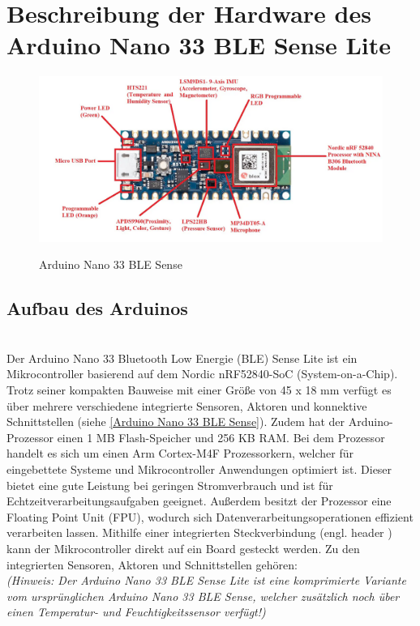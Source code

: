
\chapter{Beschreibung der Hardware des Arduino Nano 33 BLE Sense Lite}
\begin{figure}[htb]
	\begin{center}
		
		\includegraphics[width=\textwidth]{General/ArduinoBoard.png}
		\caption{Arduino Nano 33 BLE Sense}\cite{eTech.2021} \label{Arduino Nano 33 BLE Sense}
	\end{center}
\end{figure}
\section{Aufbau des Arduinos}
\cite{Ard}
\\
Der Arduino Nano 33 Bluetooth Low Energie (BLE) Sense Lite ist ein Mikrocontroller basierend auf dem Nordic nRF52840-SoC (System-on-a-Chip). Trotz seiner kompakten Bauweise mit einer Größe von 45 x 18 mm verfügt es über mehrere verschiedene integrierte Sensoren, Aktoren und konnektive Schnittstellen (siehe \autoref{Arduino Nano 33 BLE Sense}). Zudem hat der Arduino-Prozessor einen 1 MB Flash-Speicher und 256 KB RAM. Bei dem Prozessor handelt es sich um einen Arm \textregistered Cortex-M4F Prozessorkern, welcher für eingebettete Systeme und Mikrocontroller Anwendungen optimiert ist. Dieser bietet eine gute Leistung bei geringen Stromverbrauch und ist für Echtzeitverarbeitungsaufgaben geeignet. Außerdem besitzt der Prozessor eine Floating Point Unit (FPU), wodurch sich Datenverarbeitungsoperationen effizient verarbeiten lassen.\cite{Arm}
Mithilfe einer integrierten Steckverbindung (engl. \glqq header \grqq) kann der Mikrocontroller direkt auf ein Board gesteckt werden. Zu den integrierten Sensoren, Aktoren und Schnittstellen gehören:
\\ \emph{(Hinweis: Der Arduino Nano 33 BLE Sense Lite ist eine komprimierte Variante vom ursprünglichen Arduino Nano 33 BLE Sense, welcher zusätzlich noch über einen Temperatur- und Feuchtigkeitssensor verfügt!)} 

